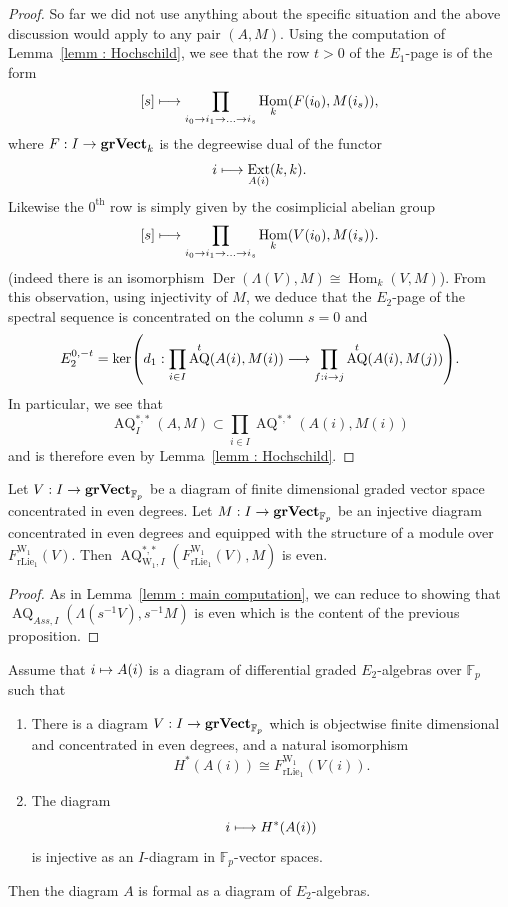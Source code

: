 \documentclass[AHL,Unicode,longabstracts,published]{cedram}
\renewcommand{\rm}[1]{{\mathrm{#1}}}
\DeclareMathOperator{\Ext}{Ext}
\DeclareMathOperator{\Hom}{Hom}
\DeclareMathOperator{\Der}{Der}
\DeclareMathOperator{\AQ}{AQ}
\DeclareMathOperator{\rlie}{rLie}
\newcommand{\grVect}{\mathbf{grVect}}
\newcommand{\W}{\mathrm{W}}
\newcommand{\FF}{\mathbb{F}}
\renewcommand*{\to}{\mathchoice{\longrightarrow}{\rightarrow}{\rightarrow}{\rightarrow}}
\let\oldmapsto\mapsto
\renewcommand*{\mapsto}{\mathchoice{\longmapsto}{\oldmapsto}{\oldmapsto}{\oldmapsto}}
\let\originalleft\left
\let\originalright\right
\renewcommand{\left}{\mathopen{}\mathclose\bgroup\originalleft}
\renewcommand{\right}{\aftergroup\egroup\originalright}
\newcommand{\FF}{\mathbb{F}}
\begin{document}
\begin{proof}
So far we did not use anything about the specific situation and the above discussion would apply to any pair $(A,M)$. Using the computation of Lemma~\ref{lemm : Hochschild}, we see that the row $t>0$ of the $E_1$-page is of the form
\[
[s]\mapsto \prod_{i_0\to i_1\to\ldots\to i_s}\Hom_k(F(i_0),M(i_s)),
\]
where $F: I\to\grVect_k$ is the degreewise dual of the functor
\[
i\mapsto \Ext_{A(i)}(k,k).
\]
Likewise the $0^{\rm{th}}$ row is simply given by the cosimplicial abelian group
\[
[s]\mapsto \prod_{i_0\to i_1\to\ldots\to i_s}\Hom_k(V(i_0),M(i_s)).
\]
(indeed there is an isomorphism $\Der(\Lambda(V),M)\cong\Hom_k(V,M)$). From this observation, using injectivity of $M$, we deduce that the $E_2$-page of the spectral sequence is concentrated on the column $s=0$ and
\[
E_2^{0,-t}=\ker\left(d_1: \prod_{i\in I}\AQ^{t}(A(i),M(i))\to \prod_{f: i\to j}\AQ^{t}(A(i),M(j))\right).
\]
In particular, we see that
\[
\AQ^{*,*}_I(A,M)\subset\prod_{i\in I}\AQ^{*,*}(A(i),M(i))
\]
and is therefore even by Lemma~\ref{lemm : Hochschild}.
\end{proof}



\begin{coro}
Let $V: I\to\grVect_{\FF_p}$ be a diagram of finite dimensional graded vector space concentrated in even degrees. Let $M: I\to\grVect_{\FF_p}$ be an injective diagram concentrated in even degrees and equipped with the structure of a module over $F_{\rlie_1}^{\W_1}(V)$. Then $\AQ_{\W_1,I}^{*,*}(F_{\rlie_1}^{\W_1}(V),M)$ is even.
\end{coro}

\begin{proof}
As in Lemma~\ref{lemm : main computation}, we can reduce to showing that $\AQ_{Ass,I}(\Lambda(s^{-1}V),s^{-1}M)$ is even which is the content of the previous proposition.
\end{proof}

\begin{theo}\label{theorem : main in family}
Assume that $i\mapsto A(i)$ is a diagram of differential graded $E_2$-algebras over $\FF_p$ such that
\begin{enumerate}
\item\label{theo5.4.1} There is a diagram $V: I\to\grVect_{\FF_p}$ which is objectwise finite dimensional and concentrated in even degrees, and a natural isomorphism
\[
H^*(A(i))\cong F_{\rlie_1}^{\W_1}(V(i)).
\]
\item\label{theo5.4.2} The diagram
\[
i\mapsto H^*(A(i))
\]
is injective as an $I$-diagram in $\FF_p$-vector spaces.
\end{enumerate}
Then the diagram $A$ is formal as a diagram of $E_2$-algebras.
\end{theo}
\end{document}
